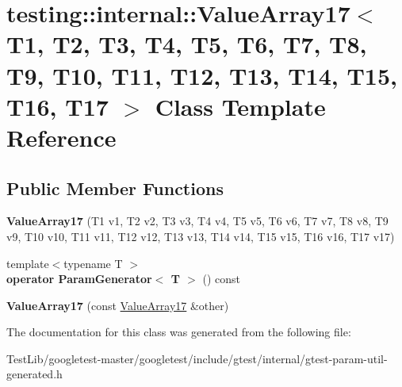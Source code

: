 \hypertarget{classtesting_1_1internal_1_1ValueArray17}{}\section{testing\+:\+:internal\+:\+:Value\+Array17$<$ T1, T2, T3, T4, T5, T6, T7, T8, T9, T10, T11, T12, T13, T14, T15, T16, T17 $>$ Class Template Reference}
\label{classtesting_1_1internal_1_1ValueArray17}
\subsection*{Public Member Functions}
\begin{DoxyCompactItemize}
\item 
\mbox{\label{classtesting_1_1internal_1_1ValueArray17_a943a86a365abde6bdd667e1ad2dbff9b}} 
{\bfseries Value\+Array17} (T1 v1, T2 v2, T3 v3, T4 v4, T5 v5, T6 v6, T7 v7, T8 v8, T9 v9, T10 v10, T11 v11, T12 v12, T13 v13, T14 v14, T15 v15, T16 v16, T17 v17)
\item 
\mbox{\label{classtesting_1_1internal_1_1ValueArray17_a31189716b99483febb83ae7436cd3f6f}} 
{\footnotesize template$<$typename T $>$ }\\{\bfseries operator Param\+Generator$<$ T $>$} () const
\item 
\mbox{\label{classtesting_1_1internal_1_1ValueArray17_a20233ef4958a1b16ec7a8c004f1604fb}} 
{\bfseries Value\+Array17} (const \hyperlink{classtesting_1_1internal_1_1ValueArray17}{Value\+Array17} \&other)
\end{DoxyCompactItemize}


The documentation for this class was generated from the following file\+:\begin{DoxyCompactItemize}
\item 
Test\+Lib/googletest-\/master/googletest/include/gtest/internal/gtest-\/param-\/util-\/generated.\+h\end{DoxyCompactItemize}

